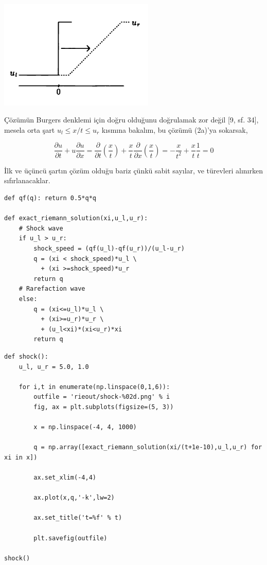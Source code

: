 \documentclass[12pt,fleqn]{article}\usepackage{../../common}
\begin{document}
\includegraphics[width=20em]{compscieng_bpp50fv1_02.png}

Çözümün Burgers denklemi için doğru olduğunu doğrulamak zor değil [9, sf. 34],
mesela orta şart $u_l \le x/t \le u_r $ kısmına bakalım, bu çözümü (2a)'ya
sokarsak,

$$
\frac{\partial u}{\partial t} + u \frac{\partial u}{\partial x} =
\frac{\partial }{\partial t} \left( \frac{x}{t}  \right) +
\frac{x}{t} \frac{\partial }{\partial x} \left( \frac{x}{t}  \right) =
-\frac{x}{t^2} + \frac{x}{t} \frac{1}{t} = 0
$$

İlk ve üçüncü şartın çözüm olduğu bariz çünkü sabit sayılar, ve türevleri
alınırken sıfırlanacaklar.

\begin{verbatim}
def qf(q): return 0.5*q*q
    
def exact_riemann_solution(xi,u_l,u_r):
    # Shock wave
    if u_l > u_r: 
        shock_speed = (qf(u_l)-qf(u_r))/(u_l-u_r)
        q = (xi < shock_speed)*u_l \
          + (xi >=shock_speed)*u_r
        return q
    # Rarefaction wave
    else:  
        q = (xi<=u_l)*u_l \
          + (xi>=u_r)*u_r \
          + (u_l<xi)*(xi<u_r)*xi
        return q
\end{verbatim}

\begin{verbatim}
def shock():
    u_l, u_r = 5.0, 1.0

    for i,t in enumerate(np.linspace(0,1,6)):
        outfile = 'rieout/shock-%02d.png' % i
        fig, ax = plt.subplots(figsize=(5, 3))
                    
        x = np.linspace(-4, 4, 1000)
        
        q = np.array([exact_riemann_solution(xi/(t+1e-10),u_l,u_r) for xi in x])

        ax.set_xlim(-4,4)

        ax.plot(x,q,'-k',lw=2)

        ax.set_title('t=%f' % t)
    
        plt.savefig(outfile)

shock() 
\end{verbatim}
\end{document}
